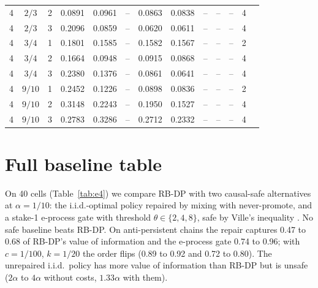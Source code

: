\documentclass{article}
\theoremstyle{plain}
\theoremstyle{definition}
\theoremstyle{remark}
\begin{document}
\begin{table}[h]
\begin{tabular}{ccccccccccccc}
4 & $2/3$ & 2 & 0.0891 & 0.0961 & -- & 0.0863 & 0.0838 & -- & -- & -- & 4\\
4 & $2/3$ & 3 & 0.2096 & 0.0859 & -- & 0.0620 & 0.0611 & -- & -- & -- & 4\\
4 & $3/4$ & 1 & 0.1801 & 0.1585 & -- & 0.1582 & 0.1567 & -- & -- & -- & 2\\
4 & $3/4$ & 2 & 0.1664 & 0.0948 & -- & 0.0915 & 0.0868 & -- & -- & -- & 4\\
4 & $3/4$ & 3 & 0.2380 & 0.1376 & -- & 0.0861 & 0.0641 & -- & -- & -- & 4\\
4 & $9/10$ & 1 & 0.2452 & 0.1226 & -- & 0.0898 & 0.0836 & -- & -- & -- & 2\\
4 & $9/10$ & 2 & 0.3148 & 0.2243 & -- & 0.1950 & 0.1527 & -- & -- & -- & 4\\
4 & $9/10$ & 3 & 0.2783 & 0.3286 & -- & 0.2712 & 0.2332 & -- & -- & -- & 4\\
\bottomrule
\end{tabular}
\end{table}

\section{Full baseline table}
\label{app:e4}

On 40 cells (Table~\ref{tab:e4}) we compare RB-DP with two causal-safe alternatives at $\alpha=1/10$: the i.i.d.-optimal policy repaired by mixing with never-promote, and a stake-1 e-process gate with threshold $\theta\in\{2,4,8\}$, safe by Ville's inequality \citep{ville1939etude,ramdas2023gametheoretic}. No safe baseline beats RB-DP. On anti-persistent chains the repair captures 0.47 to 0.68 of RB-DP's value of information and the e-process gate 0.74 to 0.96; with $c=1/100$, $k=1/20$ the order flips (0.89 to 0.92 and 0.72 to 0.80). The unrepaired i.i.d.\ policy has more value of information than RB-DP but is unsafe ($2\alpha$ to $4\alpha$ without costs, $1.33\alpha$ with them).
\end{document}
